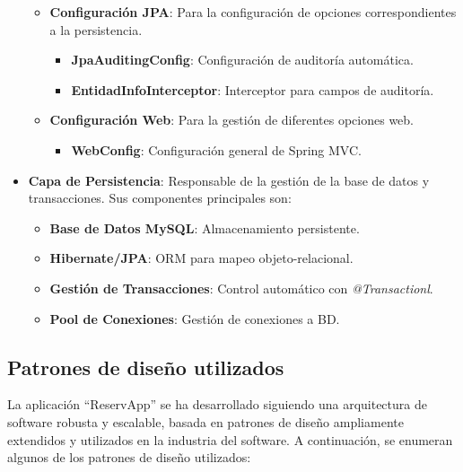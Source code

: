 \begin{itemize}
\begin{itemize}
            \item \textbf{Configuración JPA}: Para la configuración de opciones correspondientes a la persistencia.
        	\begin{itemize}
                \item \textbf{JpaAuditingConfig}: Configuración de auditoría automática.
                \item \textbf{EntidadInfoInterceptor}: Interceptor para campos de auditoría.
            \end{itemize}

            \item \textbf{Configuración Web}: Para la gestión de diferentes opciones web.
        	\begin{itemize}
                \item \textbf{WebConfig}: Configuración general de Spring MVC.
             \end{itemize}
         \end{itemize}

	\item \textbf{Capa de Persistencia}: Responsable de la gestión de la base de datos y transacciones. Sus componentes principales son:
    	\begin{itemize}
            \item \textbf{Base de Datos MySQL}: Almacenamiento persistente.
            \item \textbf{Hibernate/JPA}: ORM para mapeo objeto-relacional.
            \item \textbf{Gestión de Transacciones}: Control automático con \emph{@Transactionl}.
            \item \textbf{Pool de Conexiones}: Gestión de conexiones a BD.
         \end{itemize}
\end{itemize}

\subsection{Patrones de diseño utilizados}
La aplicación ``ReservApp'' se ha desarrollado siguiendo una arquitectura de software robusta y escalable, basada en patrones de diseño ampliamente extendidos y utilizados en la industria del software. A continuación, se enumeran algunos de los patrones de diseño utilizados:

